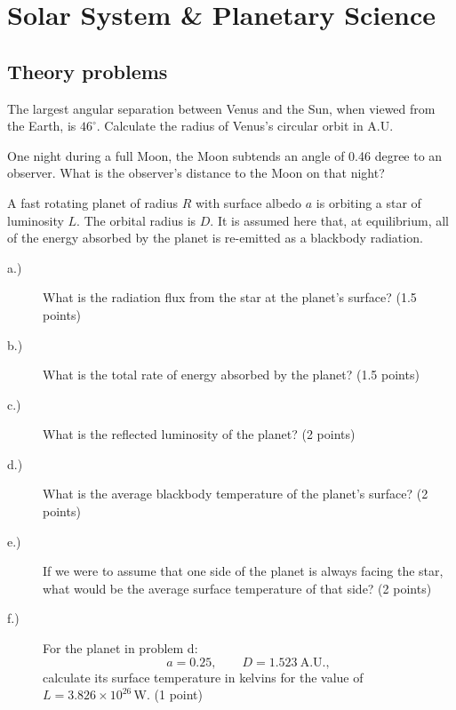 \chapter{Solar System \& Planetary Science}

\section*{Theory problems}

The largest angular separation between Venus and the Sun, when viewed from the
Earth, is $46^\circ$. Calculate the radius of Venus's circular orbit in A.U.

One night during a full Moon, the Moon subtends an angle of 0.46 degree to an
observer. What is the observer's distance to the Moon on that night?

A fast rotating planet of radius $R$ with surface albedo $a$ is orbiting a star
of luminosity $L$. The orbital radius is $D$. It is assumed here that, at
equilibrium, all of the energy absorbed by the planet is re-emitted as a
blackbody radiation.

\begin{description}
\item[a.)] What is the radiation flux from the star at the planet's surface?
  \hfill(1.5 points)
\item[b.)] What is the total rate of energy absorbed by the planet?
  \hfill(1.5 points)
\item[c.)] What is the reflected luminosity of the planet? \hfill(2 points)
\item[d.)] What is the average blackbody temperature of the planet's surface?
  \hfill(2 points)
\item[e.)] If we were to assume that one side of the planet is always facing
  the star, what would be the average surface temperature of that side?
  \hfill(2 points)
\item[f.)] For the planet in problem d:
  \[ a = 0.25, \qquad D = 1.523\ \mathrm{A.U.}, \]
  calculate its surface temperature in kelvins for the value of
  $L = 3.826 \times 10^{26}$\,W. \hfill(1 point)
\end{description}

